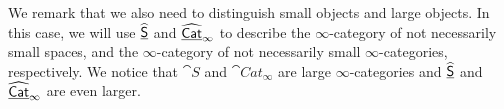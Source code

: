 We remark that we also need to distinguish small objects and large objects. In this case, we will use $\underline{\widehat{\mathsf{S}}}$ and
$\underline{\widehat{\mathsf{Cat}}}_\infty$ to describe the $\infty$-category of not necessarily small spaces, and the $\infty$-category 
of not necessarily small $\infty$-categories, respectively. We notice that $\cat S$ and $\cat{Cat}_\infty$ are large
$\infty$-categories and $\underline{\widehat{\mathsf{S}}}$ and $\underline{\widehat{\mathsf{Cat}}}_\infty$ are even larger.